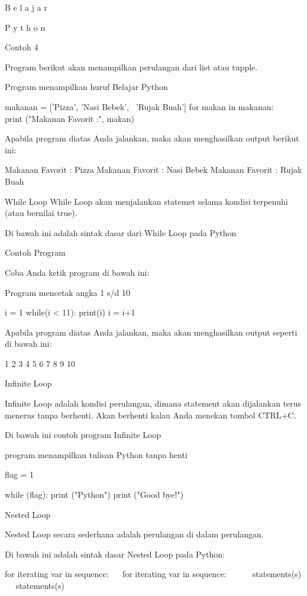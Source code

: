  
B 
e 
l 
a 
j 
a 
r 
  
P 
y 
t 
h 
o 
n 

Contoh 4

Program berikut akan menampilkan perulangan dari list atau tupple.

 
Program menampilkan huruf Belajar Python 

makanan = ['Pizza', 'Nasi Bebek',~ 'Rujak Buah'] 
for makan in makanan: 
~~ print ("Makanan Favorit :", makan) 

Apabila program diatas Anda jalankan, maka akan menghasilkan output berikut ini:

 
Makanan Favorit : Pizza 
Makanan Favorit : Nasi Bebek 
Makanan Favorit : Rujak Buah 



While Loop 
While Loop akan menjalankan statemet selama kondisi terpenuhi (atau bernilai true).

Di bawah ini adalah sintak dasar dari While Loop pada Python

Contoh Program

Coba Anda ketik program di bawah ini:

 
Program mencetak angka 1 s/d 10 

i = 1 
while(i < 11): 
 print(i) 
 i = i+1 

Apabila program diatas Anda jalankan, maka akan menghasilkan output seperti di bawah ini:

 
1 
2 
3 
4 
5 
6 
7 
8 
9 
10 



Infinite Loop 

Infinite Loop adalah kondisi perulangan, dimana statement akan dijalankan terus menerus tanpa berhenti. Akan berhenti kalau Anda menekan tombol CTRL+C.

Di bawah ini contoh program Infinite Loop

 
program menampilkan tulisan Python tanpa henti 

flag = 1 

while (flag): print ("Python") 
print ("Good bye!") 



Nested Loop 

Nested Loop secara sederhana adalah perulangan di dalam perulangan.

Di bawah ini adalah sintak dasar Nested Loop pada Python:

 
for iterating     var in sequence: 
~~ for iterating     var in sequence: 
~~~~~ statements(s) 
~~ statements(s) 

